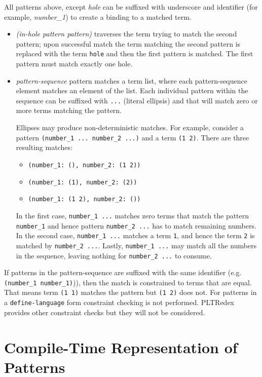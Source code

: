 All patterns above, except \textit{hole} can be suffixed with underscore and identifier (for example, \textit{number\_1}) to create a binding to a matched term.

\begin{itemize}
\item
\textit{(in-hole pattern pattern)} traverses the term trying to match the second pattern; upon successful match the term matching the second pattern is replaced with the term \texttt{hole} and then the first pattern is matched. The first pattern must match exactly one hole.

\item
\textit{pattern-sequence} pattern matches a term list, where each pattern-sequence element matches an element of the list. Each individual pattern within the sequence can be suffixed with \texttt{...} (literal ellipsis) and that will match zero or more terms matching the pattern.

Ellipses may produce non-deterministic matches. For example, consider a pattern \texttt{(number\_1\ ...\ number\_2\ ...)} and a term \texttt{(1 2)}. There are three resulting matches: 
\begin{itemize}
	\item \texttt{(number\_1:\ (), number\_2:\ (1 2))}
	\item \texttt{(number\_1:\ (1), number\_2:\ (2))}
	\item \texttt{(number\_1:\ (1 2), number\_2:\ ())}
\end{itemize}
		
In the first case, \texttt{number\_1 ...} matches zero terms that match the pattern \texttt{number\_1} and hence pattern \texttt{number\_2\ ...} has to match remaining numbers. In the second case, \texttt{number\_1\ ...} matches a term \texttt{1}, and hence the term \texttt{2} is matched by \texttt{number\_2 ...}. Lastly, \texttt{number\_1\ ...} may match all the numbers in the sequence, leaving nothing for \texttt{number\_2\ ...} to consume.
\end{itemize}

If patterns in the pattern-sequence are suffixed with the same identifier (e.g. \texttt{(number\_1 number\_1)})), then the match is constrained to terms that are equal. That means term \texttt{(1 1)} matches the pattern but \texttt{(1 2)} does not. For patterns in a \texttt{define-language} form constraint checking is not performed. PLTRedex provides other constraint checks but they will not be considered.

\section{Compile-Time Representation of Patterns}

